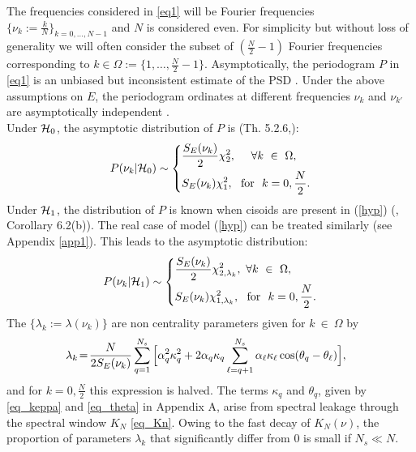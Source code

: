 \documentclass[journal]{IEEEtran}
\begin{document}
The  frequencies considered { in 
 \eqref{eq1} will be}  Fourier frequencies $\{\nu_k:=\frac{k}{N}\}_{k=0,\hdots,N-1}$ and  $N$ is considered even. For simplicity but without loss of generality we will often consider the subset of $(\frac{N}{2}-1)$  Fourier frequencies corresponding to $k\in \Omega := \{ 1,\hdots,  {\frac{N}{2}-1}\}$.
Asymptotically, the  periodogram $P$ in 
{ \eqref{eq1}} is an unbiased but inconsistent estimate of the PSD \cite{Brillinger_1981}. 
   Under the above assumptions on $E$, the periodogram ordinates at different frequencies $\nu_k$ and $\nu_{k'}$ are asymptotically independent  \cite{Li_2014}. \\
Under  ${\cal{H}}_0$, the asymptotic distribution of $P$ is (Th. 5.2.6,\cite{Brillinger_1981}):
\begin{equation}  P(\nu_k | {\cal{H}}_0) \sim
  \left\{         
      \begin{aligned}
	& \frac{S_E(\nu_k)}{2}  \chi^2_2 , ~~~~ \forall k ~ \in ~ \Omega,   \\
	&  S_E(\nu_k) \chi^2_1, ~ \text{ for } ~ k = 0, \frac{N}{2}.
      \end{aligned}
    \right.
    \label{dist}
\end{equation}
 Under ${\cal{H}}_1$, the distribution of $P$ is known when cisoids are present  in (\ref{hyp}) (\cite{Li_2014}, Corollary 6.2(b)).
The real case of  model  (\ref{hyp}) can be treated similarly (see  Appendix \ref{app1}). This leads to
the asymptotic distribution:
\begin{equation}  P(\nu_k | {\cal{H}}_1) \sim
  \left\{         
      \begin{aligned}
	 & \frac{S_E(\nu_k)}{2}  \chi_{2,  \lambda_k}^2 ,~ \forall k ~ \in ~ \Omega,  \\
	 &{S_E(\nu_k)}  \chi^2_{1,  \lambda_k}, ~ \text{ for } ~ k = 0, \frac{N}{2}.
      \end{aligned}
    \right.
    \label{dist2}
\end{equation}
The  $\{\lambda_k := \lambda(\nu_k)\}$ are  non centrality parameters given for $k ~ \in ~ \Omega$ by
\begin{equation} \hspace{-3mm}
  \label{lambda}  
	 \lambda_k \!= \!  \frac{N}{2 S_E(\nu_k)}   \sum_{q=1}^{N_s}  \Big[  \alpha_q^2 \kappa_q ^2 + 2 \alpha_q \kappa_q \sum_{\ell = q+1}^{N_s}  \alpha_\ell \kappa_\ell  \cos(\theta_q-\theta_\ell )\Big],
\end{equation}
and for $k = 0, \frac{N}{2}$ this expression is halved.
The terms $\kappa_q$ and $\theta_q$, given by \eqref{eq_keppa} and \eqref{eq_theta} in Appendix A, arise from  spectral leakage
{  through the spectral window $K_N$  \eqref{eq_Kn}.
Owing to the fast decay of $K_N(\nu)$,
the proportion of parameters  $\lambda_k$ that significantly differ from $0$ is small if $N_s\ll N$.}
\end{document}

